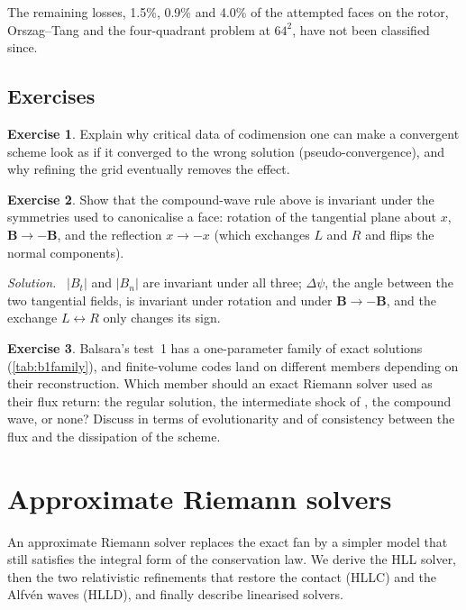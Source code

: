 \documentclass[11pt,a4paper,oneside,openany]{book}
\newcommand{\textcite}{\citet}
\theoremstyle{definition}
\newtheorem{exercise}{Exercise}[chapter]
\theoremstyle{plain}
\theoremstyle{remark}
\newenvironment{solution}{\par\smallskip\noindent\small\textit{Solution.}\ }{\par\medskip}
\newcommand{\BB}{\bm{B}}
\begin{document}
The remaining losses, 1.5\%, 0.9\% and 4.0\% of the attempted faces on the rotor,
Orszag--Tang and the four-quadrant problem at $64^2$, have not been classified since.

\section*{Exercises}

\begin{exercise}
Explain why critical data of codimension one can make a convergent scheme look as if it
converged to the wrong solution (pseudo-convergence), and why refining the grid eventually
removes the effect.
\end{exercise}

\begin{exercise}
Show that the compound-wave rule above is invariant under the symmetries used to
canonicalise a face: rotation of the tangential plane about $x$, $\BB\to-\BB$, and the
reflection $x\to-x$ (which exchanges $L$ and $R$ and flips the normal components).
\end{exercise}
\begin{solution}
$|B_t|$ and $|B_n|$ are invariant under all three; $\Delta\psi$, the angle between the two
tangential fields, is invariant under rotation and under $\BB\to-\BB$, and the exchange
$L\leftrightarrow R$ only changes its sign.
\end{solution}

\begin{exercise}
Balsara's test~1 has a one-parameter family of exact solutions (\cref{tab:b1family}), and
finite-volume codes land on different members depending on their reconstruction. Which
member should an exact Riemann solver used as their flux return: the regular solution, the
intermediate shock of \textcite{GiacomazzoRezzolla2006}, the compound wave, or none? Discuss
in terms of evolutionarity and of consistency between the flux and the dissipation of the
scheme.
\end{exercise}


\chapter{Approximate Riemann solvers}\label{ch:approx}

An approximate Riemann solver replaces the exact fan by a simpler model that still
satisfies the integral form of the conservation law. We derive the HLL solver, then the
two relativistic refinements that restore the contact (HLLC) and the Alfvén waves (HLLD),
and finally describe linearised solvers.
\end{document}
